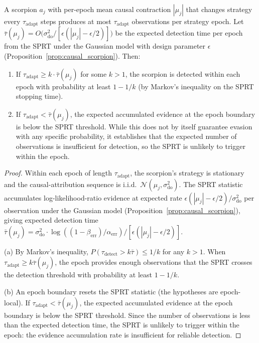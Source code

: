 \begin{proposition}
\label{prop:evasion_bandwidth}
A scorpion $a_j$ with per-epoch mean causal contraction $|\mu_j|$
    that changes strategy every $\tau_{\mathrm{adapt}}$ steps
    produces at most $\tau_{\mathrm{adapt}}$ observations per strategy
    epoch. Let
    $\bar{\tau}(\mu_j) = O\bigl(\sigma_{\mathrm{do}}^2 /
    [\epsilon(|\mu_j| - \epsilon/2)]\bigr)$ be the expected detection
    time per epoch from the SPRT under the Gaussian model with
    design parameter $\epsilon$
    (Proposition~\ref{prop:causal_scorpion}). Then:
\begin{enumerate}
\item[\textbf{(a)}] If
    $\tau_{\mathrm{adapt}} \geq k \cdot \bar{\tau}(\mu_j)$ for some
    $k > 1$, the scorpion is detected within each epoch with
    probability at least $1 - 1/k$ (by Markov's inequality on the
    SPRT stopping time).
\item[\textbf{(b)}] If $\tau_{\mathrm{adapt}} < \bar{\tau}(\mu_j)$,
    the expected accumulated evidence at the epoch boundary is below
    the SPRT threshold. While this does not by itself guarantee
    evasion with any specific probability, it establishes that the
    expected number of observations is insufficient for detection,
    so the SPRT is unlikely to trigger within the epoch.
\end{enumerate}
\end{proposition}

\begin{proof}
Within each epoch of length $\tau_{\mathrm{adapt}}$, the scorpion's
strategy is stationary and the causal-attribution sequence is i.i.d.\
$\mathcal{N}(\mu_j, \sigma_{\mathrm{do}}^2)$. The SPRT
statistic accumulates log-likelihood-ratio evidence at expected rate
$\epsilon(|\mu_j| - \epsilon/2) / \sigma_{\mathrm{do}}^2$ per
observation under the Gaussian model
(Proposition~\ref{prop:causal_scorpion}), giving expected detection time
$\bar{\tau}(\mu_j) =
\sigma_{\mathrm{do}}^2 \cdot
\log((1 - \beta_{\mathrm{err}}) / \alpha_{\mathrm{err}}) /
[\epsilon(|\mu_j| - \epsilon/2)]$.

(a) By Markov's inequality,
$P(\tau_{\mathrm{detect}} > k \bar{\tau}) \leq 1/k$ for any $k > 1$.
When $\tau_{\mathrm{adapt}} \geq k \bar{\tau}(\mu_j)$, the epoch
provides enough observations that the SPRT crosses the detection
threshold with probability at least $1 - 1/k$.

(b) An epoch boundary resets the SPRT statistic (the hypotheses are
epoch-local). If $\tau_{\mathrm{adapt}} < \bar{\tau}(\mu_j)$, the
expected accumulated evidence at the epoch boundary is below the
SPRT threshold. Since the number of observations is less than the
expected detection time, the SPRT is unlikely to trigger within the
epoch: the evidence accumulation rate is insufficient for reliable
detection.
\end{proof}

